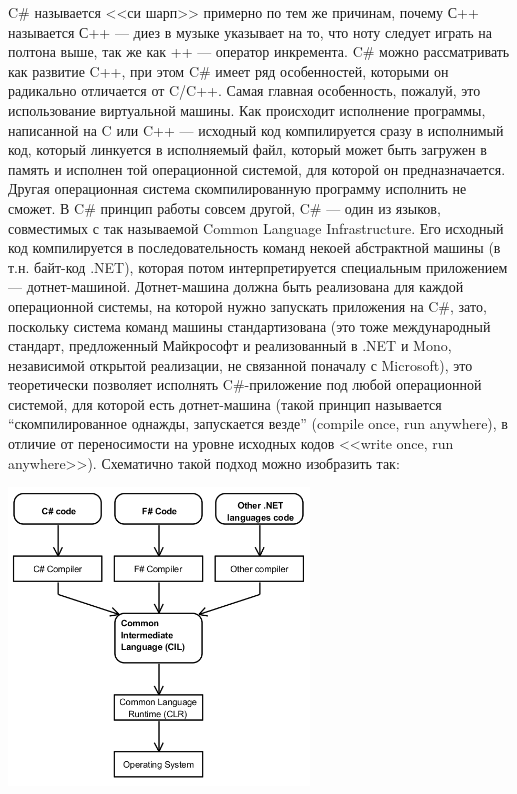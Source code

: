 \documentclass{../../text-style}
\begin{document}
C\# называется <<си шарп>> примерно по тем же причинам, почему С++ называется С++ --- диез в музыке указывает на то, что ноту следует играть на полтона выше, так же как ++ --- оператор инкремента. C\# можно рассматривать как развитие C++, при этом C\# имеет ряд особенностей, которыми он радикально отличается от C/C++. Самая главная особенность, пожалуй, это использование виртуальной машины. Как происходит исполнение программы, написанной на C или C++ --- исходный код компилируется сразу в исполнимый код, который линкуется в исполняемый файл, который может быть загружен в память и исполнен той операционной системой, для которой он предназначается. Другая операционная система скомпилированную программу исполнить не сможет. В C\# принцип работы совсем другой, C\# --- один из языков, совместимых с так называемой Common Language Infrastructure. Его исходный код компилируется в последовательность команд некоей абстрактной машины (в т.н. байт-код .NET), которая потом интерпретируется специальным приложением --- дотнет-машиной. Дотнет-машина должна быть реализована для каждой операционной системы, на которой нужно запускать приложения на C\#, зато, поскольку система команд машины стандартизована (это тоже международный стандарт, предложенный Майкрософт и реализованный в .NET и Mono, независимой открытой реализации, не связанной поначалу с Microsoft), это теоретически позволяет исполнять C\#-приложение под любой операционной системой, для которой есть дотнет-машина (такой принцип называется \enquote{скомпилированное однажды, запускается везде} (compile once, run anywhere), в отличие от переносимости на уровне исходных кодов <<write once, run anywhere>>). Схематично такой подход можно изобразить так:

\begin{center}
    \includegraphics[width=0.6\textwidth]{cli.png}
\end{center}
\end{document}
